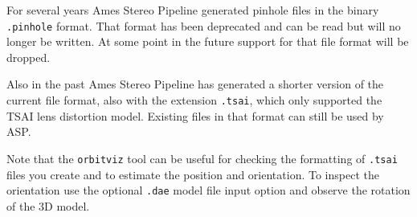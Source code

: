 For several years Ames Stereo Pipeline generated pinhole files in the binary \texttt{.pinhole} format.
That format has been deprecated and can be read but will no longer be written.  
At some point in the future support for that file format will be dropped.

Also in the past Ames Stereo Pipeline has generated a shorter version of the current file
format, also with the extension \texttt{.tsai}, which only supported the TSAI lens distortion model.
Existing files in that format can still be used by ASP.

Note that the \texttt{orbitviz} tool can be useful for checking the formatting of \texttt{.tsai}
files you create and to estimate the position and orientation. To inspect the orientation use 
the optional \texttt{.dae} model file input option and observe the rotation of the 3D model.







